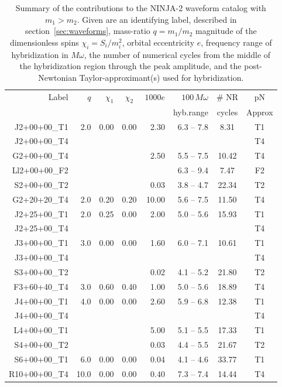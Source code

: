 %
\begin{table}
\caption[Submissions to NINJA-2]{
\label{tab:ninja2_submissions2}
Summary of the contributions to the NINJA-2 waveform catalog with $m_1
> m_2$.  Given are an identifying label, described in 
section~\ref{sec:waveforms}, 
mass-ratio $q=m_1/m_2$
magnitude of the dimensionless spins $\chi_i=S_i/m_i^2$, orbital
eccentricity $e$, frequency range of hybridization in $M\omega$, the
number of numerical cycles from the middle of the hybridization region
through the peak amplitude, and the post-Newtonian Taylor-approximant(s)
used for hybridization.
}
  \begin{tabular}{@{}rrrcrrcc}
      Label & $q$ & $\chi_{1}$ & $\chi_{2}$ & $1000e$   & $100\,M\omega$ & \# NR 
& pN \\
      &    &     &            &            & hyb.range & cycles & Approx \\
J2+00+00\_T1 & 2.0  &  0.00  &  0.00  &  2.30  &   6.3 -- 7.8  &  8.31  & T1\\
J2+00+00\_T4 & & & & & & & T4 \\
G2+00+00\_T4 &   &    &    &  2.50  &  5.5 -- 7.5  &  10.42  &  T4 \\
Ll2+00+00\_F2 &   &    &    &    &  6.3 -- 9.4  &  7.47  &  F2 \\
S2+00+00\_T2 &   &    &    &  0.03  &  3.8 -- 4.7  &  22.34  &  T2 \\
G2+20+20\_T4 & 2.0  &  0.20  &  0.20  &  10.00  &   5.6 -- 7.5  &  11.50  &  T4 
\\
J2+25+00\_T1 & 2.0  &  0.25  &  0.00  &  2.00  &   5.0 -- 5.6  &  15.93  & T1\\
J2+25+00\_T4 & & & & & & & T4 \\
J3+00+00\_T1 & 3.0  &  0.00  &  0.00  &  1.60  &   6.0 -- 7.1  &  10.61  & T1\\
J3+00+00\_T4 & & & & & & & T4 \\
S3+00+00\_T2 &   &    &    &  0.02  &  4.1 -- 5.2  &  21.80  &  T2 \\
F3+60+40\_T4 & 3.0  &  0.60  &  0.40  &  1.00  &   5.0 -- 5.6  &  18.89  &  T4 
\\
J4+00+00\_T1 & 4.0  &  0.00  &  0.00  &  2.60  &   5.9 -- 6.8  &  12.38  & T1\\
J4+00+00\_T4 & & & & & & & T4 \\
L4+00+00\_T1 &   &    &    &  5.00  &  5.1 -- 5.5  &  17.33  &  T1 \\
S4+00+00\_T2 &   &    &    &  0.03  &  4.4 -- 5.5  &  21.67  &  T2 \\
S6+00+00\_T1 & 6.0  &  0.00  &  0.00  &  0.04  &   4.1 -- 4.6  &  33.77  &  T1 
\\
R10+00+00\_T4 & 10.0  &  0.00  &  0.00  &  0.40  &   7.3 -- 7.4  &  14.44  &  T4 
\\
    \end{tabular}
\end{table}

